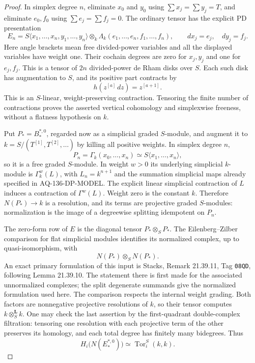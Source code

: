 \begin{proof}
In simplex degree $n$, eliminate $x_0$ and $y_0$ using
$\sum x_j=\sum y_j=T$, and eliminate $e_0,f_0$ using
$\sum e_j=\sum f_j=0$. The ordinary tensor has the explicit
PD presentation
\[
 E_n=S\langle x_1,\ldots,x_n,y_1,\ldots,y_n\rangle
       \otimes_k\Lambda_k(e_1,\ldots,e_n,f_1,\ldots,f_n),
 \qquad dx_j=e_j,\quad dy_j=f_j.
\]
Here angle brackets mean free divided-power variables and
all the displayed variables have weight one. Their cochain
degrees are zero for $x_j,y_j$ and one for $e_j,f_j$.
This is a tensor of $2n$ divided-power de Rham disks over $S$.
Each such disk has augmentation to $S$, and its positive
part contracts by
\[
                    h(z^{[a]}\,dz)=z^{[a+1]}.
\]
This is an $S$-linear, weight-preserving contraction.
Tensoring the finite number of contractions proves the
asserted vertical cohomology and simplexwise freeness,
without a flatness hypothesis on $k$.

Put $P_*=B_*^{*,0}$, regarded now as a simplicial graded
$S$-module, and augment it to $k=S/(T^{[1]},T^{[2]},\ldots)$
by killing all positive weights. In simplex degree $n$,
\[
 P_n=\Gamma_k(x_0,\ldots,x_n)
       \simeq S\langle x_1,\ldots,x_n\rangle,
\]
so it is a free graded $S$-module. In weight $w>0$ its
underlying simplicial $k$-module is $\Gamma^w_k(L)$, with
$L_n=k^{n+1}$ and the summation simplicial maps already
specified in AQ-136-DP-MODEL. The explicit linear simplicial
contraction of $L$ induces a contraction of $\Gamma^w(L)$.
Weight zero is the constant $k$. Therefore $N(P_*)\to k$
is a resolution, and its terms are projective graded
$S$-modules: normalization is the image of a degreewise
splitting idempotent on $P_n$.

The zero-form row of $E$ is the diagonal tensor $P_*\otimes_S P_*$.
The Eilenberg--Zilber comparison for flat simplicial modules
identifies its normalized complex, up to quasi-isomorphism,
with
\[
                  N(P_*)\otimes_S N(P_*).
\]
An exact primary formulation of this input is Stacks,
Remark 21.39.11, Tag \texttt{08QD}, following
Lemma 21.39.10. The statement there is first made for the
associated unnormalized complexes; the split degenerate
summands give the normalized formulation used here.
The comparison respects the internal weight grading.
Both factors are nonnegative projective resolutions of
$k$, so their tensor computes $k\otimes_S^{\mathbf L}k$.
One may check the last assertion by the first-quadrant
double-complex filtration: tensoring one resolution with
each projective term of the other preserves its homology,
and each total degree has finitely many bidegrees. Thus
\[
 H_i\bigl(N(E^{*,0}_*)\bigr)
                         \simeq\operatorname{Tor}_i^S(k,k).
                                                               \tag{136.T2}
\]


\end{proof}
